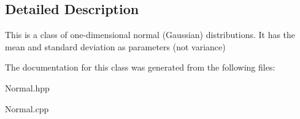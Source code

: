 \subsection{Detailed Description}
This is a class of one-\/dimensional normal (Gaussian) distributions. It has the mean and standard deviation as parameters (not variance) 

The documentation for this class was generated from the following files\+:\begin{DoxyCompactItemize}
\item 
Normal.\+hpp\item 
Normal.\+cpp\end{DoxyCompactItemize}
